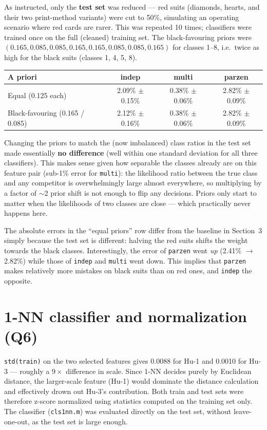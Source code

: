 \documentclass[11pt,a4paper]{article}
\begin{document}
As instructed, only the \textbf{test set} was reduced --- red suits
(diamonds, hearts, and their two print-method variants) were cut to 50\%,
simulating an operating scenario where red cards are rarer. This was
repeated 10 times; classifiers were trained once on the full (cleaned)
training set. The black-favouring priors were
$(0.165, 0.085, 0.085, 0.165, 0.165, 0.085, 0.085, 0.165)$ for classes 1--8,
i.e.\ twice as high for the black suits (classes 1, 4, 5, 8).

\begin{table}[h!]
\centering
\begin{tabular}{@{}lccc@{}}
\toprule
A priori & indep & multi & parzen \\
\midrule
Equal (0.125 each) & 2.09\% $\pm$ 0.15\% & 0.38\% $\pm$ 0.06\% & 2.82\% $\pm$ 0.09\% \\
Black-favouring (0.165 / 0.085) & 2.12\% $\pm$ 0.16\% & 0.38\% $\pm$ 0.06\% & 2.82\% $\pm$ 0.09\% \\
\bottomrule
\end{tabular}
\end{table}

Changing the priors to match the (now imbalanced) class ratios in the test
set made essentially \textbf{no difference} (well within one standard
deviation for all three classifiers). This makes sense given how separable
the classes already are on this feature pair (sub-1\% error for
\texttt{multi}): the likelihood ratio between the true class and any
competitor is overwhelmingly large almost everywhere, so multiplying by a
factor of $\sim$2 prior shift is not enough to flip any decisions. Priors
only start to matter when the likelihoods of two classes are close ---
which practically never happens here.

The absolute errors in the ``equal priors'' row differ from the baseline in
Section~3 simply because the test set is different: halving the red suits shifts
the weight towards the black classes. Interestingly, the error of \texttt{parzen}
went \emph{up} (2.41\% $\to$ 2.82\%) while those of \texttt{indep} and
\texttt{multi} went down. This implies that \texttt{parzen} makes relatively
more mistakes on black suits than on red ones, and \texttt{indep} the opposite.

\section{1-NN classifier and normalization (Q6)}

\texttt{std(train)} on the two selected features gives 0.0088 for Hu-1 and
0.0010 for Hu-3 --- roughly a $9\times$ difference in scale. Since 1-NN
decides purely by Euclidean distance, the larger-scale feature (Hu-1) would
dominate the distance calculation and effectively drown out Hu-3's
contribution. Both train and test sets were therefore z-score normalized
using statistics computed on the training set only. The classifier
(\texttt{cls1nn.m}) was evaluated directly on the test set, without
leave-one-out, as the test set is large enough.
\end{document}
